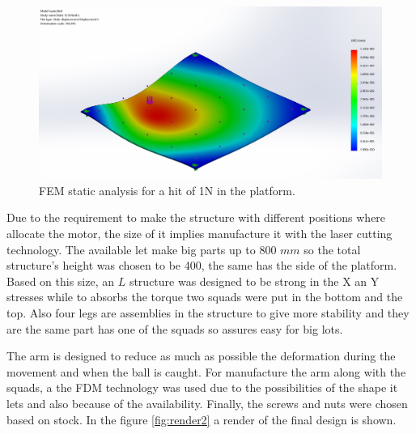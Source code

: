 		\begin{figure}[!ht]
			\begin{center}
				\includegraphics[width=.8\textwidth]{figures/FEM}
			\end{center}
			\caption{FEM static analysis for a hit of 1N in the platform.}
			\label{fig:FEM}
		\end{figure}

		Due to the requirement to make the structure with different positions where allocate the motor, the size of it implies manufacture it with the laser cutting technology. 
		The available let make big parts up to 800 $mm$ so the total structure's height was chosen to be 400, the same has the side of the platform. 
		Based on this size, an $L$ structure was designed to be strong in the X an Y stresses while to absorbs the torque two squads were put in the bottom and the top.
		Also four legs are assemblies in the structure to give more stability and they are the same part has one of the squads so assures easy for big lots.

		The arm is designed to reduce as much as possible the deformation during the movement and when the ball is caught. For manufacture the arm along with the squads, a the FDM technology was used due to the possibilities of the shape it lets and also because of the availability. Finally, the screws and nuts were chosen based on stock. In the figure \ref{fig:render2} a render of the final design is shown.

